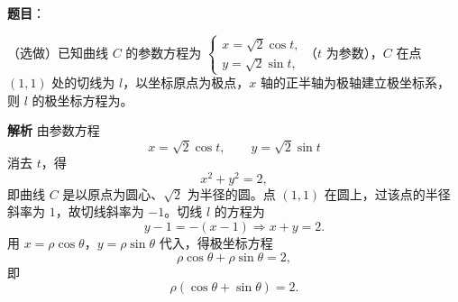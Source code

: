 \begin{answer}

\textbf{题目}：

（选做）已知曲线 $C$ 的参数方程为 $\begin{cases}x=\sqrt2\cos t,\\ y=\sqrt2\sin t,\end{cases}$（$t$ 为参数），$C$ 在点 $(1,1)$ 处的切线为 $l$，以坐标原点为极点，$x$ 轴的正半轴为极轴建立极坐标系，则 $l$ 的极坐标方程为\gkblank{}。

\textbf{解析}
由参数方程
\nopagebreak[4]
\[x=\sqrt2\cos t,\qquad y=\sqrt2\sin t\]
消去 $t$，得
\nopagebreak[4]
\[x^2+y^2=2,\]
即曲线 $C$ 是以原点为圆心、$\sqrt2$ 为半径的圆。点 $(1,1)$ 在圆上，过该点的半径斜率为 $1$，故切线斜率为 $-1$。切线 $l$ 的方程为
\nopagebreak[4]
\[y-1=-(x-1)\Longrightarrow x+y=2.\]
用 $x=\rho\cos\theta$，$y=\rho\sin\theta$ 代入，得极坐标方程
\nopagebreak[4]
\[\rho\cos\theta+\rho\sin\theta=2,\]
即
\nopagebreak[4]
\[\rho(\cos\theta+\sin\theta)=2.\]


\end{answer}

